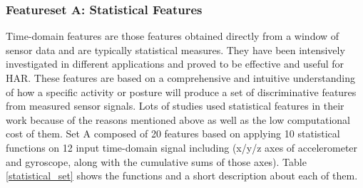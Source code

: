 \documentclass[journal,article,submit,moreauthors,pdftex]{Definitions/mdpi}
\begin{document}
\subsubsection{Featureset A: Statistical Features}
Time-domain features are those features obtained directly from a window of sensor data and are typically statistical measures. They have been intensively investigated in different applications and proved to be effective and useful for HAR. These features are based on a comprehensive and intuitive understanding of how a specific activity or posture will produce a set of discriminative features from measured sensor signals. Lots of studies used statistical features in their work because of the reasons mentioned above as well as the low computational cost of them. Set A composed of 20 features based on applying 10 statistical functions on 12 input time-domain signal including (x/y/z axes of accelerometer and gyroscope, along with the cumulative sums of those axes). Table \ref{statistical_set} shows the functions and a short description about each of them.
\end{document}
